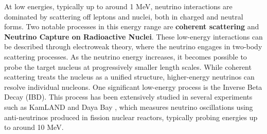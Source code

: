 At low energies, typically up to around 1 MeV, neutrino interactions are dominated by scattering off leptons and nuclei, both in charged and neutral forms. Two notable processes in this energy range are \textbf{coherent scattering} and \textbf{Neutrino Capture on Radioactive Nuclei}. These low-energy interactions can be described through electroweak theory, where the neutrino engages in two-body scattering processes. As the neutrino energy increases, it becomes possible to probe the target nucleus at progressively smaller length scales. While coherent scattering treats the nucleus as a unified structure, higher-energy neutrinos can resolve individual nucleons. One significant low-energy process is the Inverse Beta Decay (IBD). This process has been extensively studied in several experiments such as KamLAND  and Daya Bay , which measures neutrino oscillations using  anti-neutrinos produced in fission nuclear reactors, typically probing energies up to around 10 MeV.

